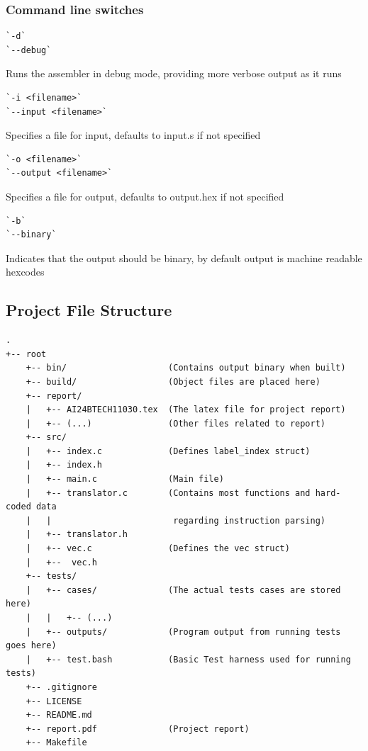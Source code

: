 \documentclass[12pt]{article}
\begin{document}
    \subsubsection*{Command line switches}
    \begin{verbatim}
`-d` 
`--debug`\end{verbatim}
    Runs the assembler in debug mode, providing more verbose output as it runs
    \\
    
    \begin{verbatim}
`-i <filename>`
`--input <filename>`\end{verbatim}
    Specifies a file for input, defaults to input.s if not specified
    \\
    
    \begin{verbatim}
`-o <filename>`
`--output <filename>`\end{verbatim}
    Specifies a file for output, defaults to output.hex if not specified
    \\

    \begin{verbatim}
`-b`
`--binary`\end{verbatim}
    Indicates that the output should be binary, by default output is machine readable hexcodes

    \newpage
    \subsection{Project File Structure}

    \begin{verbatim}
.
+-- root
    +-- bin/                    (Contains output binary when built)
    +-- build/                  (Object files are placed here)
    +-- report/
    |   +-- AI24BTECH11030.tex  (The latex file for project report)
    |   +-- (...)               (Other files related to report)
    +-- src/
    |   +-- index.c             (Defines label_index struct)
    |   +-- index.h
    |   +-- main.c              (Main file)
    |   +-- translator.c        (Contains most functions and hard-coded data 
    |   |                        regarding instruction parsing)
    |   +-- translator.h
    |   +-- vec.c               (Defines the vec struct)
    |   +--  vec.h
    +-- tests/
    |   +-- cases/              (The actual tests cases are stored here)
    |   |   +-- (...)
    |   +-- outputs/            (Program output from running tests goes here)
    |   +-- test.bash           (Basic Test harness used for running tests)
    +-- .gitignore
    +-- LICENSE
    +-- README.md
    +-- report.pdf              (Project report)
    +-- Makefile\end{verbatim}
    
\end{document}
